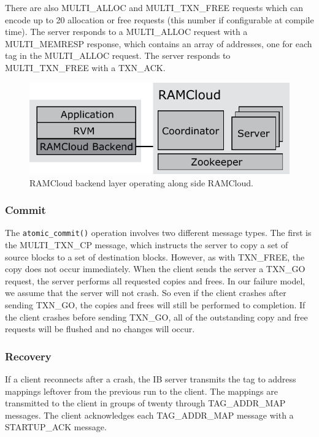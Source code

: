 There are also MULTI\_ALLOC and MULTI\_TXN\_FREE requests which can encode up
to 20 allocation or free requests (this number if configurable at compile time).
The server responds to a MULTI\_ALLOC request with a MULTI\_MEMRESP response,
which contains an array of addresses, one for each tag in the MULTI\_ALLOC
request. The server responds to MULTI\_TXN\_FREE with a TXN\_ACK.

\begin{figure}[t!]
\begin{center}
\includegraphics[scale=0.60]{graphs/ramcloud_backend_design_final.pdf}
\end{center}
\caption{RAMCloud backend layer operating along side RAMCloud.}
\label{fig:ramcloud_backend_design}
\end{figure}

\subsubsection{Commit}

The \texttt{atomic\_commit()} operation involves two different message types.
The first is the MULTI\_TXN\_CP message, which instructs the server to copy
a set of source blocks to a set of destination blocks. However, as with
TXN\_FREE, the copy does not occur immediately. When the client sends the
server a TXN\_GO request, the server performs all requested copies and frees.
In our failure model, we assume that the server will not crash. So even if
the client crashes after sending TXN\_GO, the copies and frees will still be
performed to completion. If the client crashes before sending TXN\_GO, all
of the outstanding copy and free requests will be flushed and no changes will
occur.

\subsubsection{Recovery}

If a client reconnects after a crash, the IB server transmits the tag to
address mappings leftover from the previous run to the client. The mappings
are transmitted to the client in groups of twenty through TAG\_ADDR\_MAP
messages. The client acknowledges each TAG\_ADDR\_MAP message with a
STARTUP\_ACK message.



